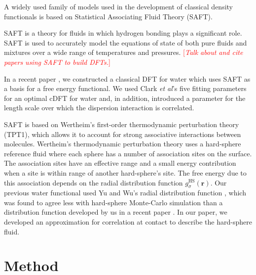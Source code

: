 \documentclass[twocolumn,amsmath,amssymb,prl]{revtex4-1}
\newcommand{\rr}{\textbf{r}}
\newcommand{\fixme}[1]{\textcolor{red}{[\emph{#1}]}}
\begin{document}
A widely used family of models used in the development of classical
density functionals is based on Statistical Associating Fluid Theory
(SAFT).

SAFT is a theory for fluids in which hydrogen bonding plays a significant
role\cite{chapman1989saft, muller2001molecular}. SAFT is used to
accurately model the equations of state of both pure fluids and
mixtures over a wide range of temperatures and pressures.
\fixme{Talk about and cite papers using SAFT to build DFTs.}

In a recent paper \cite{hughes2013classical}, we constructed a
classical DFT for water which uses SAFT as a basis for a free energy
functional. We used Clark \emph{et al}'s \cite{clark2006developing}
five fitting parameters for an optimal cDFT for water and, in
addition, introduced a parameter for the length scale over which the
dispersion interaction is correlated.

SAFT is based on Wertheim's first-order thermodynamic perturbation
theory (TPT1)\cite{wertheim1984fluidsI, wertheim1984fluidsII,
  wertheim1986fluidsIII, wertheim1986fluidsIV}, which allows it to
account for strong associative interactions between
molecules. Wertheim's thermodynamic perturbation theory uses a
hard-sphere reference fluid where each sphere has a number of
association sites on the surface. The association sites have an
effective range and a small energy contribution when a site is within
range of another hard-sphere's site. The free energy due to this
association depends on the radial distribution function
$g_\sigma^\text{HS}(\rr)$. Our previous water functional used Yu and
Wu's radial distribution function
\cite{yu2002fmt-dft-inhomogeneous-associating}, which was found to
agree less with hard-sphere Monte-Carlo simulation than a distribution
function developed by us in a recent paper \cite{schulte2012using}. In
our paper, we developed an approximation for correlation at
contact to describe the hard-sphere fluid.

\section{Method}
\end{document}
